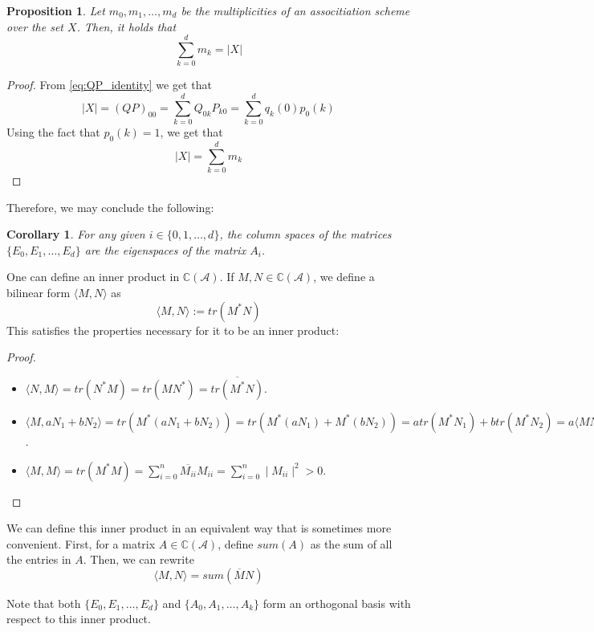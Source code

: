 \documentclass[a4paper,12pt]{article}
\theoremstyle{plain}
\newtheorem{proposition}[theorem]{Proposition}
\newtheorem{corollary}[theorem]{Corollary}
\theoremstyle{definition}
\theoremstyle{remark}
\begin{document}
\begin{proposition}
    Let $ m_0, m_1, \dots, m_d $ be the multiplicities of an associtiation
    scheme over the set $ X $. Then, it holds that
    \[ \sum_{ k=0 }^{ d } m_k = |X| \]
\end{proposition}
\begin{proof}
    From \eqref{eq:QP_identity} we get that
    \[ |X| = (QP)_{00} = \sum_{ k=0 }^{ d } Q_{0k} P_{k0} =
    \sum_{ k=0 }^{ d } q_k(0) p_0(k)   \]
    Using the fact that $ p_0(k) = 1 $, we get that
    \[ |X| = \sum_{ k=0 }^{ d } m_k \]
\end{proof}

Therefore, we may conclude the following:
\begin{corollary}
    For any given $ i \in \{ 0,1,\dots,d \} $, the column spaces of the matrices
    $ \{ E_0, E_1, \dots, E_d \} $ are the eigenspaces of the matrix $ A_i $.
\end{corollary}

One can define an inner product in $ \mathbb{C}(\mathcal{A}) $. If $ M,N \in
\mathbb{C}(\mathcal{A}) $, we define a bilinear form $ \langle M,N \rangle $ as
\[ \langle M,N \rangle := tr(M^*N) \]
This satisfies the properties necessary for it to be an inner product:
\begin{proof}
    \begin{itemize}
        \item $ \langle N,M \rangle = tr(N^*M) = tr(MN^*) = \overline{tr(M^*N)} $.
        \item $ \langle M,a N_1 + b N_2 \rangle = tr(M^*(aN_1 + bN_2)) =
            tr(M^*(aN_1) + M^*(bN_2)) = atr(M^*N_1) + btr(M^*N_2) =
            a\langle MN_1 \rangle b \langle MN_2 \rangle $.
        \item $ \langle M,M \rangle = tr(M^*M) = \sum_{ i=0 }^{ n }
            \overline{M_{ii}}M_{ii} = \sum_{ i=0 }^{ n } \mid M_{ii} \mid^2
            > 0 $.
    \end{itemize}
\end{proof}

We can define this inner product in an equivalent way that is sometimes more
convenient. First, for a matrix $ A \in \mathbb{C}(\mathcal{A}) $, define $ sum(A) $
as the sum of all the entries in $ A $. Then, we can rewrite
\[ \langle M,N \rangle = sum(\overline{M}N) \]

Note that both $ \{ E_0, E_1, \dots, E_d \} $ and $ \{ A_0, A_1, \dots, A_k \} $
form an orthogonal basis with respect to this inner product.
\end{document}
